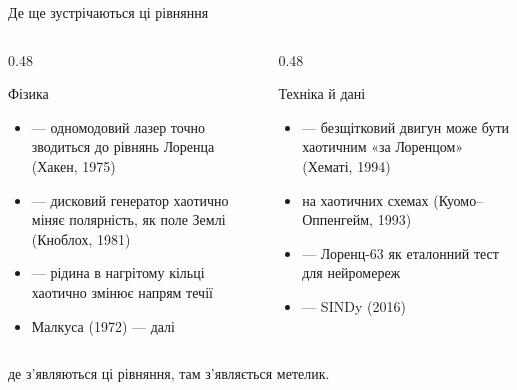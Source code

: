 \documentclass[aspectratio=169,10pt,t,notheorems]{beamer}
\begin{document}
\begin{frame}{Де ще зустрічаються ці рівняння}
  \begin{columns}[T]
    \begin{column}{0.48\textwidth}
      \begin{card}[NSky]{Фізика}
        \small
        \begin{itemize}
          \item[]  — одномодовий лазер точно зводиться до рівнянь Лоренца (Хакен, 1975)
          \item[]  — дисковий генератор хаотично міняє полярність, як поле Землі (Кноблох, 1981)
          \item[]  — рідина в нагрітому кільці хаотично змінює напрям течії
          \item[]  Малкуса (1972) — далі
        \end{itemize}
      \end{card}
    \end{column}
    \begin{column}{0.48\textwidth}
      \begin{card}[NOrange]{Техніка й дані}
        \small
        \begin{itemize}
          \item[]  — безщітковий двигун може бути хаотичним «за Лоренцом» (Хематі, 1994)
          \item[]  на хаотичних схемах (Куомо–Оппенгейм, 1993)
          \item[]  — Лоренц-63 як еталонний тест для нейромереж
          \item[]  — SINDy (2016)
        \end{itemize}
      \end{card}
    \end{column}
  \end{columns}
  \vspace{0.2em}
  \centering\small{} де з'являються ці рівняння, там з'являється метелик.
\end{frame}
\end{document}
